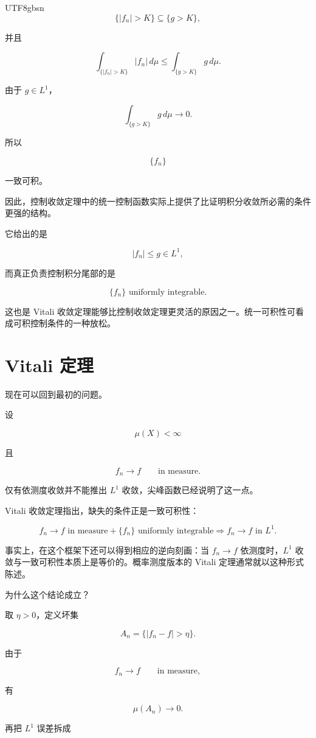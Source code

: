 \documentclass[11pt]{article}
\begin{document}
\begin{CJK*}{UTF8}{gbsn}
\[
\{|f_n|>K\}
\subseteq
\{g>K\},
\]

并且

\[
\int_{\{|f_n|>K\}}|f_n|\,d\mu
\leq
\int_{\{g>K\}}g\,d\mu.
\]

由于 $g\in L^1$，

\[
\int_{\{g>K\}}g\,d\mu\to0.
\]

所以

\[
\{f_n\}
\]

一致可积。

因此，控制收敛定理中的统一控制函数实际上提供了比证明积分收敛所必需的条件更强的结构。

它给出的是

\[
|f_n|\leq g\in L^1,
\]

而真正负责控制积分尾部的是

\[
\{f_n\}\text{ uniformly integrable}.
\]

这也是 Vitali 收敛定理能够比控制收敛定理更灵活的原因之一。统一可积性可看成可积控制条件的一种放松。


\section{Vitali 定理}


现在可以回到最初的问题。

设

\[
\mu(X)<\infty
\]

且

\[
f_n\to f
\qquad\text{in measure}.
\]

仅有依测度收敛并不能推出 $L^1$ 收敛，尖峰函数已经说明了这一点。

Vitali 收敛定理指出，缺失的条件正是一致可积性：

\[
\boxed{
f_n\to f\text{ in measure}
+
\{f_n\}\text{ uniformly integrable}
\Longrightarrow
f_n\to f\text{ in }L^1.
}
\]

事实上，在这个框架下还可以得到相应的逆向刻画：当 $f_n\to f$ 依测度时，$L^1$ 收敛与一致可积性本质上是等价的。概率测度版本的 Vitali 定理通常就以这种形式陈述。

为什么这个结论成立？

取 $\eta>0$，定义坏集

\[
A_n
=
\{|f_n-f|>\eta\}.
\]

由于

\[
f_n\to f
\qquad\text{in measure},
\]

有

\[
\mu(A_n)\to0.
\]

再把 $L^1$ 误差拆成


\end{CJK*}
\end{document}
